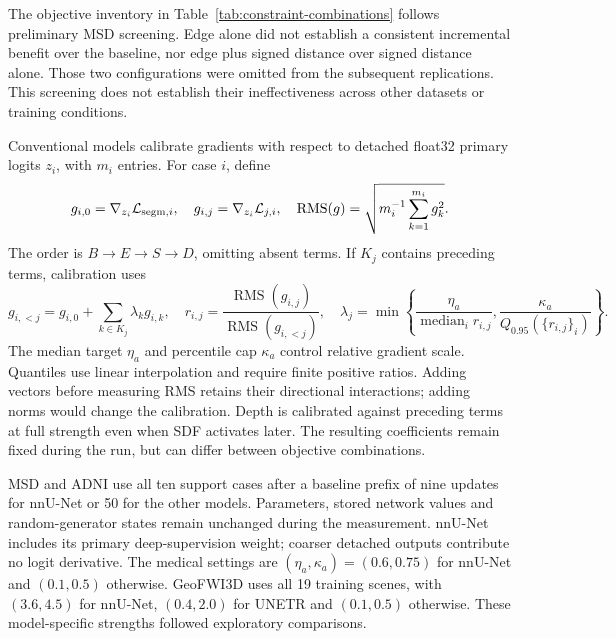 \documentclass[12pt,a4paper]{article}
\begin{document}
The objective inventory in Table~\ref{tab:constraint-combinations} follows
preliminary MSD screening. Edge alone did not establish a consistent
incremental benefit over the baseline, nor edge plus signed distance
over signed distance alone. Those two configurations were omitted from
the subsequent replications. This screening does not establish their
ineffectiveness across other datasets or training conditions.


Conventional models calibrate gradients with respect to detached
float32 primary logits $z_i$, with $m_i$ entries. For case $i$, define
\begin{equation}
g_{i,0}=\nabla_{z_i}\mathcal L_{{\rm segm},i},\quad
g_{i,j}=\nabla_{z_i}\mathcal L_{j,i},\quad
\operatorname{RMS}(g)=\sqrt{m_i^{-1}\sum_{k=1}^{m_i}g_k^2}.
\label{eq:calibration-logit-gradients}
\end{equation}
The order is $B\to E\to S\to D$, omitting absent terms. If $K_j$
contains preceding terms, calibration uses
\begin{equation}
g_{i,<j}=g_{i,0}+\sum_{k\in K_j}\lambda_k g_{i,k},\quad
r_{i,j}=\frac{\operatorname{RMS}(g_{i,j})}{\operatorname{RMS}(g_{i,<j})},\quad
\lambda_j=\min\left\{\frac{\eta_a}{\operatorname{median}_i r_{i,j}},
\frac{\kappa_a}{Q_{0.95}(\{r_{i,j}\}_i)}\right\}.
\label{eq:constraint-calibrated-coefficient}
\end{equation}
The median target $\eta_a$ and percentile cap $\kappa_a$ control relative
gradient scale. Quantiles use linear interpolation and require finite
positive ratios. Adding vectors before measuring RMS retains their
directional interactions; adding norms would change the calibration.
Depth is calibrated against preceding terms at full strength even when
SDF activates later. The resulting coefficients remain fixed during the
run, but can differ between objective combinations.

MSD and ADNI use all ten support cases after a baseline prefix of nine
updates for nnU-Net or 50 for the other models. Parameters, stored
network values and random-generator states remain unchanged during
the measurement. nnU-Net includes its primary deep-supervision weight;
coarser detached outputs contribute no logit derivative. The medical
settings are $(\eta_a,\kappa_a)=(0.6,0.75)$ for nnU-Net and
$(0.1,0.5)$ otherwise. GeoFWI3D uses all 19 training scenes, with
$(3.6,4.5)$ for nnU-Net, $(0.4,2.0)$ for UNETR and $(0.1,0.5)$
otherwise. These model-specific strengths followed exploratory comparisons.
\end{document}
